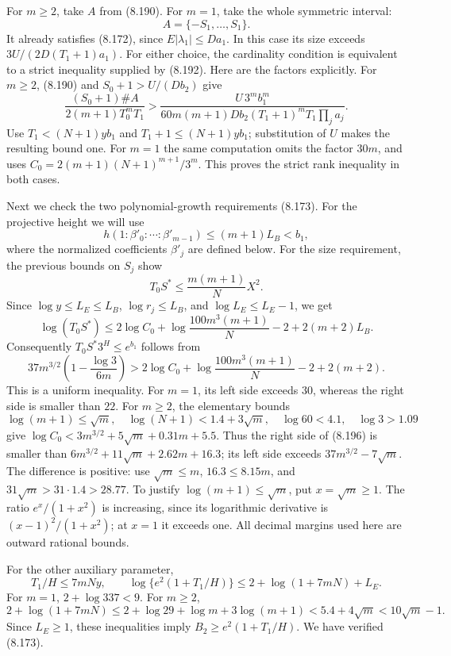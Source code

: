 \documentclass[
  11pt,
  a4paper,
]{article}
\begin{document}
For \(m\ge2\), take \(A\) from (8.190). For \(m=1\), take the whole
symmetric interval: \[
A=\{-S_1,\ldots,S_1\}.
\] It already satisfies (8.172), since \(E|\lambda_1|\le Da_1\). In this
case its size exceeds \(3U/(2D(T_1+1)a_1)\). For either choice, the
cardinality condition is equivalent to a strict inequality supplied by
(8.192). Here are the factors explicitly. For \(m\ge2\), (8.190) and
\(S_0+1>U/(Db_2)\) give \[
\frac{(S_0+1)\#A}{2(m+1)T_0^mT_1}
>
\frac{U\,3^m b_1^m}
{60m(m+1)Db_2(T_1+1)^mT_1\prod_ja_j}.
\] Use \(T_1<(N+1)yb_1\) and \(T_1+1\le(N+1)yb_1\); substitution of
\(U\) makes the resulting bound one. For \(m=1\) the same computation
omits the factor \(30m\), and uses \(C_0=2(m+1)(N+1)^{m+1}/3^m\). This
proves the strict rank inequality in both cases.

Next we check the two polynomial-growth requirements (8.173). For the
projective height we will use \[
h(1:\beta'_0:\cdots:\beta'_{m-1})\le(m+1)L_B<b_1,
\tag{8.195}
\] where the normalized coefficients \(\beta'_j\) are defined below. For
the size requirement, the previous bounds on \(S_j\) show \[
T_0S^*\le\frac{m(m+1)}N X^2.
\] Since \(\log y\le L_E\le L_B\), \(\log r_j\le L_B\), and
\(\log L_E\le L_E-1\), we get \[
\log(T_0S^*)
\le
2\log C_0+
\log\frac{100m^3(m+1)}N-2+2(m+2)L_B.
\] Consequently \(T_0S^*3^H\le e^{b_1}\) follows from \[
37m^{3/2}\left(1-\frac{\log3}{6m}\right)
>
2\log C_0+\log\frac{100m^3(m+1)}N-2+2(m+2).
\tag{8.196}
\] This is a uniform inequality. For \(m=1\), its left side exceeds
\(30\), whereas the right side is smaller than \(22\). For \(m\ge2\),
the elementary bounds \[
\log(m+1)\le\sqrt m,\quad
\log(N+1)<1.4+3\sqrt m,\quad
\log60<4.1,\quad \log3>1.09
\] give \(\log C_0<3m^{3/2}+5\sqrt m+0.31m+5.5\). Thus the right side of
(8.196) is smaller than \(6m^{3/2}+11\sqrt m+2.62m+16.3\); its left side
exceeds \(37m^{3/2}-7\sqrt m\). The difference is positive: use
\(\sqrt m\le m\), \(16.3\le8.15m\), and \(31\sqrt m>31\cdot1.4>28.77\).
To justify \(\log(m+1)\le\sqrt m\), put \(x=\sqrt m\ge1\). The ratio
\(e^x/(1+x^2)\) is increasing, since its logarithmic derivative is
\((x-1)^2/(1+x^2)\); at \(x=1\) it exceeds one. All decimal margins used
here are outward rational bounds.

For the other auxiliary parameter, \[
T_1/H\le7mNy,\qquad
\log\{e^2(1+T_1/H)\}
\le2+\log(1+7mN)+L_E.
\] For \(m=1\), \(2+\log337<9\). For \(m\ge2\), \[
2+\log(1+7mN)
\le2+\log29+\log m+3\log(m+1)
<5.4+4\sqrt m<10\sqrt m-1.
\] Since \(L_E\ge1\), these inequalities imply \(B_2\ge e^2(1+T_1/H)\).
We have verified (8.173).
\end{document}
